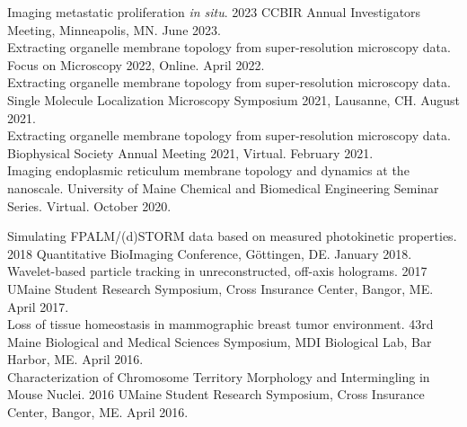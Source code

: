  {
    Imaging metastatic proliferation \textit{in situ}. 2023 CCBIR Annual Investigators Meeting, Minneapolis, MN. June 2023. \\

    Extracting organelle membrane topology from super-resolution microscopy data. Focus on Microscopy 2022, Online. April 2022. \\

    Extracting organelle membrane topology from super-resolution microscopy data. Single Molecule Localization Microscopy Symposium 2021, Lausanne, CH. August 2021. \\

    Extracting organelle membrane topology from super-resolution microscopy data. Biophysical Society Annual Meeting 2021, Virtual. February 2021. \\
    
    Imaging endoplasmic reticulum membrane topology and dynamics at the nanoscale. University of Maine Chemical and Biomedical Engineering Seminar Series. Virtual. October 2020. \\

}

 {        
    Simulating FPALM/(d)STORM data based on measured photokinetic properties. 2018 Quantitative BioImaging Conference, Göttingen, DE. January 2018. \\

    Wavelet-based particle tracking in unreconstructed, off-axis holograms. 2017 UMaine Student Research Symposium, Cross Insurance Center, Bangor, ME. April 2017. \\

    Loss of tissue homeostasis in mammographic breast tumor environment. 43rd Maine Biological and Medical Sciences Symposium, MDI Biological Lab, Bar Harbor, ME. April 2016. \\

    Characterization of Chromosome Territory Morphology and Intermingling in Mouse Nuclei. 2016 UMaine Student Research Symposium, Cross Insurance Center, Bangor, ME. April 2016. \\
}
\vspace{11pt}
